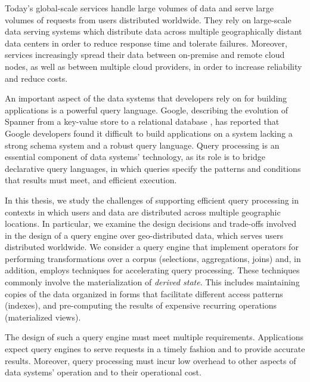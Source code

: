 
Today's global-scale services handle large volumes of data and serve large volumes of requests from users distributed worldwide.
They rely on large-scale data serving systems which distribute data across multiple geographically distant data centers
in order to reduce response time and tolerate failures.
Moreover, services increasingly spread their data between on-premise and remote cloud nodes,
as well as between multiple cloud providers, in order to increase reliability and reduce costs.

An important aspect of the data systems that developers rely on for building applications is a powerful query language.
Google, describing the evolution of Spanner from a key-value store to a relational database \cite{corbett:spanner},
has reported that Google developers found it difficult to build applications on a system lacking a strong schema system
and a robust query language.
Query processing is an essential component of data systems' technology, as its role is to bridge declarative query languages,
in which queries specify the patterns and conditions that results must meet, and efficient execution.

In this thesis, we study the challenges of supporting efficient query processing in contexts in
which users and data are distributed across multiple geographic locations.
In particular, we examine the design decisions and trade-offs involved in the design of a query engine over geo-distributed
data, which serves users distributed worldwide.
We consider a query engine that implement operators for performing transformations over a corpus (selections, aggregations, joins)
and, in addition, employs techniques for accelerating query processing.
These techniques commonly involve the materialization of \textit{derived state}.
This includes maintaining copies of the data organized in forms that facilitate different access patterns (indexes),
and pre-computing the results of expensive recurring operations (materialized views).

The design of such a query engine must meet multiple requirements.
Applications expect query engines to serve requests in a timely fashion and to provide accurate results.
Moreover, query processing must incur low overhead to other aspects of data systems' operation and to their operational cost.

